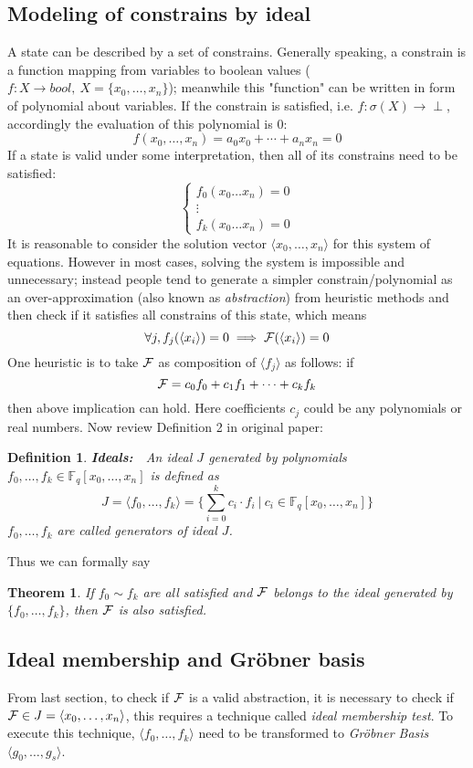 \documentclass[conference,10pt]{IEEEtran}
\newtheorem{Definition}{Definition}[section]
\newtheorem{Theorem}{Theorem}[section]
\begin{document}
\subsection{Modeling of constrains by ideal}
A state can be described by a set of constrains. Generally speaking, a constrain is a function mapping 
from variables to boolean values ($f:X\to bool,\ X=\{x_0,\dots,x_n\}$); meanwhile this "function" can be
written in form of polynomial about variables. If the constrain is satisfied, i.e. $f:\sigma(X)\to \perp$,
accordingly the evaluation of this polynomial is 0:
$$f(x_0,\dots,x_n) = a_0x_0+\cdots + a_nx_n = 0$$
If a state is valid under some interpretation, then all of its constrains need to be satisfied:
\begin{equation}
\left\{
\begin{array}{ll}
f_0(x_0\dots x_n) = 0\\
\vdots\\
f_k(x_0\dots x_n) = 0
\end{array}\right.
\nonumber
\end{equation}
It is reasonable to consider the solution vector $\langle x_0,\dots,x_n\rangle$ for this system of 
equations. However in most cases, solving the system is impossible and unnecessary; instead people
tend to generate a simpler constrain/polynomial as an over-approximation (also known as \emph{abstraction})
from heuristic methods and then check if it satisfies all constrains of this state, which means
$$\forall j, f_j(\langle x_i\rangle) = 0\implies{\mathcal{F}}(\langle x_i\rangle) = 0  $$
One heuristic is to take ${\mathcal{F}}$ as composition of $\langle f_j\rangle$ as follows: if
$${\mathcal{F}} = c_0f_0+c_1f_1+\cdots+c_kf_k$$
then above implication can hold. Here coefficients $c_j$ could be any polynomials
or real numbers. Now review Definition 2 in original paper:
\begin{Definition}
{\bf Ideals:}\ \ An \emph{ideal} $J$ generated by polynomials $f_0,\dots,f_k\in \mathbb{F}_q[x_0,\dots,x_n]$
is defined as $$J = \langle f_0,\dots,f_k\rangle = \{\sum_{i=0}^{k}c_i\cdot f_i\ |\ c_i\in\mathbb{F}_q[x_0,
\dots,x_n]\}$$
$f_0,\dots,f_k$ are called \emph{generators} of ideal $J$.
\end{Definition}
Thus we can formally say
\begin{Theorem}
If $f_0\sim f_k$ are all satisfied and ${\mathcal{F}}$ belongs to the \emph{ideal} generated by $\{f_0,\dots,f_k\}$, then
${\mathcal{F}}$ is also satisfied.
\end{Theorem}

\subsection{Ideal membership and Gr\"obner basis}
From last section, to check if ${\mathcal{F}}$ is a valid abstraction, it is necessary to check if 
${\mathcal{F}}\in J=\langle x_0,\dots,x_n\rangle$, this requires a technique called \emph{ideal membership test}.
To execute this technique, $\langle f_0,\dots,f_k\rangle$ need to be transformed to \emph{Gr\"obner Basis}
$\langle g_0,\dots,g_s\rangle$.
\end{document}
